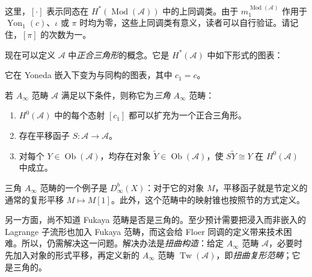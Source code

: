 这里，$[\cdot]$ 表示同态在 $H^*(\operatorname{Mod}(\mathcal A))$ 中的上同调类。由于 $m_1^{\operatorname{Mod}(\mathcal A)}$ 作用于 $\operatorname{Yon}_1(c)$、$\iota$ 或 $\pi$ 时均为零，这些上同调类有意义，读者可以自行验证。请记住，$[\pi]$ 的次数为一。

现在可以定义 $\mathcal A$ 中\emph{正合三角形}的概念。它是 $H^*(\mathcal A)$ 中如下形式的图表：
\begin{figure}[H]
\centering
{}
\end{figure}
它在 Yoneda 嵌入下变为与同构的图表，其中 $c_1=c$。

\begin{definition}\label{def:8.15}
若 $A_\infty$ 范畴 $\mathcal A$ 满足以下条件，则称它为\emph{三角} $A_\infty$ 范畴：
\begin{enumerate}
\item $H^0(\mathcal A)$ 中的每个态射 $[c_1]$ 都可以扩充为一个正合三角形。
\item 存在平移函子 $S\colon\mathcal A\to\mathcal A$。
\item 对每个 $Y\in\operatorname{Ob}(\mathcal A)$，均存在对象 $\widetilde Y\in\operatorname{Ob}(\mathcal A)$，使 $S\widetilde Y\cong Y$ 在 $H^0(\mathcal A)$ 中成立。
\end{enumerate}
\end{definition}

三角 $A_\infty$ 范畴的一个例子是 $D^b_\infty(X)$：对于它的对象 $M$，平移函子就是节定义的通常的复形平移 $M\mapsto M[1]$。此外，这个范畴中的映射锥也按照节的方式定义。

另一方面，尚不知道 Fukaya 范畴是否是三角的。至少预计需要把浸入而非嵌入的 Lagrange 子流形也加入 Fukaya 范畴，而这会给 Floer 同调的定义带来技术困难。所以，仍需解决这一问题。解决办法是\emph{扭曲构造}：给定 $A_\infty$ 范畴 $\mathcal A$，必要时先加入对象的形式平移，再定义新的 $A_\infty$ 范畴 $\operatorname{Tw}(\mathcal A)$，即\emph{扭曲复形范畴}；它是三角的。

